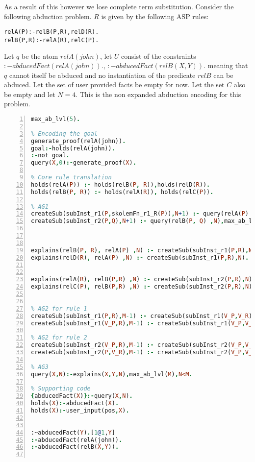 \documentclass{article}
\begin{document}
As a result of this however we lose complete term substitution. Consider the following abduction problem. $R$ is given by the following ASP rules:
\begin{verbatim}
relA(P):-relB(P,R),relD(R).
relB(P,R):-relA(R),relC(P).
\end{verbatim}
Let $q$ be the atom $relA(john)$, let $U$ consist of the constraints $:-abducedFact(relA(john)).$, $:-abducedFact(relB(X,Y)).$ meaning that $q$ cannot itself be abduced and no instantiation of the predicate $relB$ can be abduced. Let the set of user provided facts be empty for now. Let the set $C$ also be empty and let $N = 4$. This is the non expanded abduction encoding for this problem. 
\begin{lstlisting}[language=Prolog, numbers=left]
max_ab_lvl(5).

% Encoding the goal
generate_proof(relA(john)).
goal:-holds(relA(john)).
:-not goal.
query(X,0):-generate_proof(X).

% Core rule translation
holds(relA(P)) :- holds(relB(P, R)),holds(relD(R)).
holds(relB(P, R)) :- holds(relA(R)), holds(relC(P)).

% AG1
createSub(subInst_r1(P,skolemFn_r1_R(P)),N+1) :- query(relA(P) ,N),max_ab_lvl(M),N<M-1.
createSub(subInst_r2(P,Q),N+1) :- query(relB(P, Q) ,N),max_ab_lvl(M),N<M-1.



explains(relB(P, R), relA(P) ,N) :- createSub(subInst_r1(P,R),N).
explains(relD(R), relA(P) ,N) :- createSub(subInst_r1(P,R),N).


explains(relA(R), relB(P,R) ,N) :- createSub(subInst_r2(P,R),N).
explains(relC(P), relB(P,R) ,N) :- createSub(subInst_r2(P,R),N).


% AG2 for rule 1
createSub(subInst_r1(P,R),M-1) :- createSub(subInst_r1(V_P,V_R),N), holds(relB(P, R)),max_ab_lvl(M).
createSub(subInst_r1(V_P,R),M-1) :- createSub(subInst_r1(V_P,V_R),N), holds(relD(R)),max_ab_lvl(M).

% AG2 for rule 2
createSub(subInst_r2(V_P,R),M-1) :- createSub(subInst_r2(V_P,V_R),N), holds(relA(R)),max_ab_lvl(M).
createSub(subInst_r2(P,V_R),M-1) :- createSub(subInst_r2(V_P,V_R),N), holds(relC(P)),max_ab_lvl(M).

% AG3
query(X,N):-explains(X,Y,N),max_ab_lvl(M),N<M.

% Supporting code
{abducedFact(X)}:-query(X,N).
holds(X):-abducedFact(X).
holds(X):-user_input(pos,X).


:~abducedFact(Y).[1@1,Y]
:-abducedFact(relA(john)).
:-abducedFact(relB(X,Y)).


\end{lstlisting}
\end{document}
